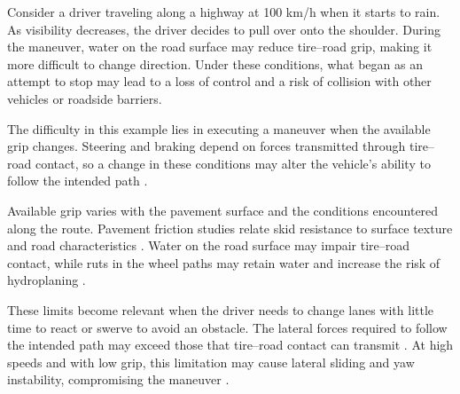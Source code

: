 \documentclass[12pt,a4paper]{report}
\begin{document}
%
Consider a driver traveling along a highway at 100 km/h when it starts to rain. As visibility decreases, the driver decides to pull over onto the shoulder. During the maneuver, water on the road surface may reduce tire--road grip, making it more difficult to change direction. Under these conditions, what began as an attempt to stop may lead to a loss of control and a risk of collision with other vehicles or roadside barriers.


The difficulty in this example lies in executing a maneuver when the available grip changes. Steering and braking depend on forces transmitted through tire--road contact, so a change in these conditions may alter the vehicle's ability to follow the intended path \cite{Bertipaglia2024Model}.

Available grip varies with the pavement surface and the conditions encountered along the route. Pavement friction studies relate skid resistance to surface texture and road characteristics \cite{Weng2026Leveraging,Isasa2025ASkid}. Water on the road surface may impair tire--road contact, while ruts in the wheel paths may retain water and increase the risk of hydroplaning \cite{Salleh2019Performance}.

These limits become relevant when the driver needs to change lanes with little time to react or swerve to avoid an obstacle. The lateral forces required to follow the intended path may exceed those that tire--road contact can transmit \cite{Bertipaglia2024Model}. At high speeds and with low grip, this limitation may cause lateral sliding and yaw instability, compromising the maneuver \cite{Hu2025Lanechanging}.
\end{document}
